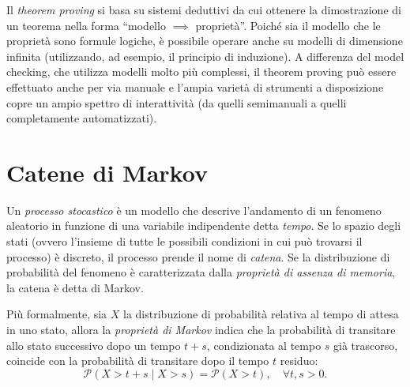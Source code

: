 		Il \emph{theorem proving} si basa su sistemi deduttivi da cui ottenere la dimostrazione di un teorema nella forma ``modello $\implies$ propriet\`a''.
		Poich\'e sia il modello che le propriet\`a sono formule logiche, \`e possibile operare anche su modelli di dimensione infinita (utilizzando, ad esempio, il principio di induzione). A differenza del model checking, che utilizza modelli molto pi\`u complessi, il theorem proving pu\`o essere effettuato anche per via manuale e l'ampia variet\`a di strumenti a disposizione copre un ampio spettro di interattivit\`a (da quelli semimanuali a quelli completamente automatizzati).
		
	\section{Catene di Markov}\label{sez:markov}
	Un \emph{processo stocastico} \`e un modello che descrive l'andamento di un fenomeno aleatorio in funzione di una variabile indipendente detta \emph{tempo}. Se lo spazio degli stati (ovvero l'insieme di tutte le possibili condizioni in cui pu\`o trovarsi il processo) \`e discreto, il processo prende il nome di \emph{catena}. Se la distribuzione di probabilit\`a del fenomeno \`e caratterizzata dalla \emph{propriet\`a di assenza di memoria}, la catena \`e detta di Markov.
	
	Pi\`u formalmente, sia $X$ la distribuzione di probabilit\`a relativa al tempo di attesa in uno stato, allora la \emph{propriet\`a di Markov} indica che la probabilit\`a di transitare allo stato successivo dopo un tempo $t + s$, condizionata al tempo $s$ gi\`a trascorso, coincide con la probabilit\`a di transitare dopo il tempo $t$ residuo:
	\begin{equation}
		\mathcal{P}(X > t + s \mid X > s) = \mathcal{P}(X > t),\quad \forall t, s > 0.\label{eq:memorylessness}
	\end{equation}
	

